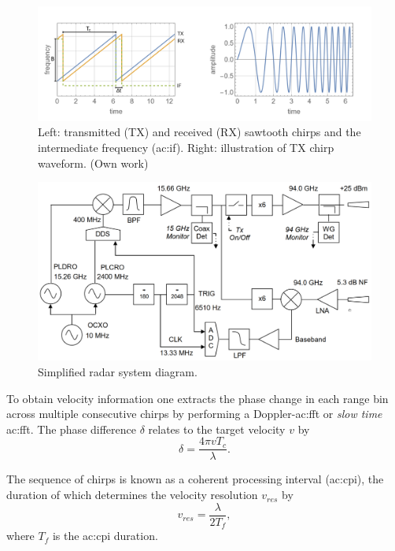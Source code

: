 \documentclass{article}
\begin{document}
\begin{figure}
	\centering
	\includegraphics[width=\textwidth]{chirp}
	\caption{Left: transmitted (TX) and received (RX) sawtooth chirps and the intermediate frequency (\acrshort{ac:if}). Right: illustration of TX chirp waveform. (Own work)}
	\label{fig:Chirp}
\end{figure}

\begin{figure}
	\centering
	\includegraphics[width=\textwidth]{radar-diagram}
	\caption{Simplified radar system diagram.\supercite{Radar}}
	\label{fig:RadarDiagram}
\end{figure}

To obtain velocity information one extracts the phase change in each range bin across multiple consecutive chirps by performing a Doppler-\acrshort{ac:fft} or \textit{slow time} \acrshort{ac:fft}.\supercite{POMRDopplerProcessing}
The phase difference \(\delta\) relates to the target velocity \(v\) by\supercite{TIFMCWDoppler}
\begin{equation}
	\delta = \frac{4 \pi v T_c}{\lambda}.
\end{equation}

The sequence of chirps is known as a coherent processing interval (\acrshort{ac:cpi}), the duration of which determines the velocity resolution \(v_{res}\) by
\begin{equation}
	v_{res} = \frac{\lambda}{2 T_f},
\end{equation}
where \(T_f\) is the \acrshort{ac:cpi} duration.
\end{document}
